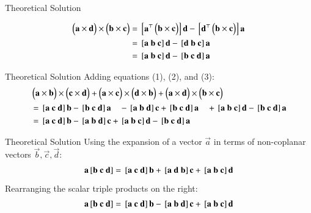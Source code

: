 \documentclass{beamer}
\begin{document}
\begin{frame}{Theoretical Solution}

\begin{align}
\myvec{\vec{a} \times\vec{d}} \times\myvec{\vec{b} \times\vec{c}}&=
\sbrak{\vec{a}^\top \myvec{\vec{b} \times \vec{c}}} \vec{d} - \sbrak{\vec{d}^\top \myvec{\vec{b} \times \vec{c}}} \vec{a}\\
&=\sbrak{\vec{a} \ \vec{b} \ \vec{c}}\vec{d} - \sbrak{\vec{d} \ \vec{b} \ \vec{c}}\vec{a} \\
&= \sbrak{\vec{a} \ \vec{b} \ \vec{c}}\vec{d} - \sbrak{\vec{b} \ \vec{c} \ \vec{d}}\vec{a}
\end{align}
\end{frame}

\begin{frame}{Theoretical Solution}
Adding equations (1), (2), and (3):
\begin{align}
& \myvec{\vec{a} \times\vec{b}} \times\myvec{\vec{c} \times\vec{d}} + \myvec{\vec{a} \times\vec{c}} \times\myvec{\vec{d} \times\vec{b}} + \myvec{\vec{a} \times\vec{d}} \times\myvec{\vec{b} \times\vec{c}}\\
&= \sbrak{\vec{a} \ \vec{c} \ \vec{d}}\vec{b} - \sbrak{\vec{b} \ \vec{c} \ \vec{d}}\vec{a} \quad -\sbrak{\vec{a} \ \vec{b} \ \vec{d}}\vec{c} + \sbrak{\vec{b} \ \vec{c} \ \vec{d}}\vec{a} \quad +\sbrak{\vec{a} \ \vec{b} \ \vec{c}}\vec{d} - \sbrak{\vec{b} \ \vec{c} \ \vec{d}}\vec{a}\\
&= \sbrak{\vec{a} \ \vec{c} \ \vec{d}}\vec{b} - \sbrak{\vec{a} \ \vec{b} \ \vec{d}}\vec{c} + \sbrak{\vec{a} \ \vec{b} \ \vec{c}}\vec{d} - \sbrak{\vec{b} \ \vec{c} \ \vec{d}}\vec{a}
\end{align}
\end{frame}

\begin{frame}{Theoretical Solution}
Using the expansion of a vector $\vec{a}$ in terms of non-coplanar vectors $\vec{b}, \vec{c}, \vec{d}$:
\begin{align}
\vec{a}\sbrak{\vec{b} \ \vec{c} \ \vec{d}} = \sbrak{\vec{a} \ \vec{c} \ \vec{d}}\vec{b} + \sbrak{\vec{a} \ \vec{d} \ \vec{b}}\vec{c} + \sbrak{\vec{a} \ \vec{b} \ \vec{c}}\vec{d}
\end{align}
Rearranging the scalar triple products on the right:
\begin{align}
\vec{a}\sbrak{\vec{b} \ \vec{c} \ \vec{d}} = \sbrak{\vec{a} \ \vec{c} \ \vec{d}}\vec{b} - \sbrak{\vec{a} \ \vec{b} \ \vec{d}}\vec{c} + \sbrak{\vec{a} \ \vec{b} \ \vec{c}}\vec{d}
\end{align}
\end{frame}
\end{document}
